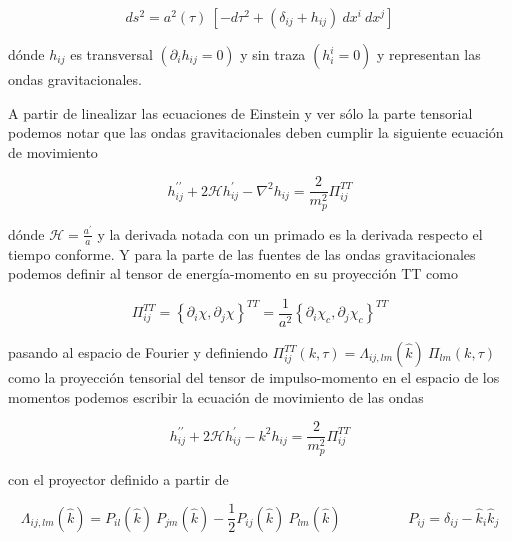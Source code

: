\begin{equation}
    ds^2 = a^2 (\tau) ~ \left[ - d\tau^2 + \left( \delta_{ij} + h_{ij} \right) ~ dx^i ~ dx^j \right]
\end{equation}

\noindent
dónde $h_{ij}$ es transversal $(\partial_i h_{ij} = 0)$ y sin traza $(h^i_i = 0)$ y representan las ondas gravitacionales.

A partir de linealizar las ecuaciones de Einstein y ver sólo la parte tensorial podemos notar que las ondas gravitacionales deben cumplir la siguiente ecuación de movimiento

\begin{equation}
    h^{\prime \prime}_{ij} + 2 \mathcal{H} h^\prime_{ij} - \nabla^2 h_{ij} = \frac{2}{m_p^2} \Pi_{ij}^{TT}
\end{equation}

\noindent
dónde $\displaystyle \mathcal{H} = \frac{a^\prime}{a}$ y la derivada notada con un primado es la derivada respecto el tiempo conforme. Y para la parte de las fuentes de las ondas gravitacionales podemos definir al tensor de energía-momento en su proyección TT como 

\begin{equation}
    \Pi^{TT}_{ij} = \left\{ \partial_i \chi, \partial_j \chi \right\}^{TT} = \frac{1}{a^2} \left\{ \partial_i \chi_c, \partial_j \chi_c \right\}^{TT}
\end{equation}

\noindent
pasando al espacio de Fourier y definiendo $\Pi_{ij}^{TT} (k, \tau) = \Lambda_{ij,lm} \left( \hat{k} \right) ~ \Pi_{lm} (k, \tau)$ como la proyección tensorial del tensor de impulso-momento en el espacio de los momentos podemos escribir la ecuación de movimiento de las ondas

\begin{equation}\label{eqn:GWs_equation}
    h^{\prime \prime}_{ij} + 2 \mathcal{H} h^\prime_{ij} - k^2 h_{ij} = \frac{2}{m_p^2} \Pi_{ij}^{TT}
\end{equation}

\noindent
con el proyector definido a partir de

\begin{equation}
    \Lambda_{ij,lm} \left( \hat{k} \right) = P_{il} \left( \hat{k} \right) ~ P_{jm} \left( \hat{k} \right) - \frac{1}{2} P_{ij} \left( \hat{k} \right) ~ P_{lm} \left( \hat{k} \right) \hspace{2cm} P_{ij} = \delta_{ij} - \hat{k}_i \hat{k}_j
\end{equation}

